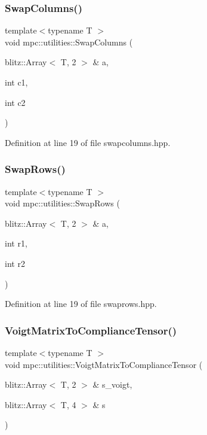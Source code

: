 \subsubsection{\texorpdfstring{Swap\+Columns()}{SwapColumns()}}
{\footnotesize\ttfamily template$<$typename T $>$ \\
void mpc\+::utilities\+::\+Swap\+Columns (\begin{DoxyParamCaption}\item[{blitz\+::\+Array$<$ T, 2 $>$ \&}]{a,  }\item[{int}]{c1,  }\item[{int}]{c2 }\end{DoxyParamCaption})}



Definition at line 19 of file swapcolumns.\+hpp.

\mbox{\label{namespacempc_1_1utilities_a7dc82dae028a331f955ec8a5aa3599a4}} 
\subsubsection{\texorpdfstring{Swap\+Rows()}{SwapRows()}}
{\footnotesize\ttfamily template$<$typename T $>$ \\
void mpc\+::utilities\+::\+Swap\+Rows (\begin{DoxyParamCaption}\item[{blitz\+::\+Array$<$ T, 2 $>$ \&}]{a,  }\item[{int}]{r1,  }\item[{int}]{r2 }\end{DoxyParamCaption})}



Definition at line 19 of file swaprows.\+hpp.

\mbox{\label{namespacempc_1_1utilities_a14f790d9a892452ed500ba8d7caf0222}} 
\subsubsection{\texorpdfstring{Voigt\+Matrix\+To\+Compliance\+Tensor()}{VoigtMatrixToComplianceTensor()}}
{\footnotesize\ttfamily template$<$typename T $>$ \\
void mpc\+::utilities\+::\+Voigt\+Matrix\+To\+Compliance\+Tensor (\begin{DoxyParamCaption}\item[{blitz\+::\+Array$<$ T, 2 $>$ \&}]{s\+\_\+voigt,  }\item[{blitz\+::\+Array$<$ T, 4 $>$ \&}]{s }\end{DoxyParamCaption})}



